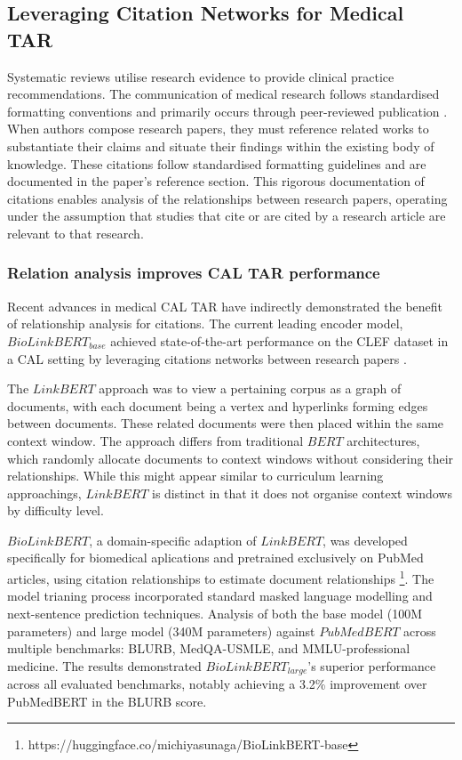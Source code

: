 \documentclass[../main.tex]{subfiles}
\begin{document}
\subsection{Leveraging Citation Networks for Medical TAR}

Systematic reviews utilise research evidence to provide clinical practice recommendations. The communication of medical research follows standardised formatting conventions and primarily occurs through peer-reviewed publication \cite{BMCMedicalResearch}. When authors compose research papers, they must reference related works to substantiate their claims and situate their findings within the existing body of knowledge. These citations follow standardised formatting guidelines and are documented in the paper's reference section. This rigorous documentation of citations enables analysis of the relationships between research papers, operating under the assumption that studies that cite or are cited by a research article are relevant to that research.

\subsubsection{Relation analysis improves CAL TAR performance}

Recent advances in medical CAL TAR have indirectly demonstrated the benefit of relationship analysis for citations. The current leading encoder model, $BioLinkBERT_{base}$ achieved state-of-the-art performance on the CLEF dataset in a CAL setting by leveraging citations networks between research papers \cite{yasunaga2022linkbertpretraininglanguagemodels, goharian_reproducibility_2024}. 


The $LinkBERT$ approach was to view a pertaining corpus as a graph of documents, with each document being a vertex and hyperlinks forming edges between documents. These related documents were then placed within the same context window. The approach differs from traditional $BERT$ architectures, which randomly allocate documents to context windows without considering their relationships. While this might appear similar to curriculum learning approachings, $LinkBERT$ is distinct in that it does not organise context windows by difficulty level. 

$BioLinkBERT$, a domain-specific adaption of $LinkBERT$, was developed specifically for biomedical aplications and pretrained exclusively on PubMed articles, using citation relationships to estimate document relationships \footnote{https://huggingface.co/michiyasunaga/BioLinkBERT-base}. The model trianing process incorporated standard masked language modelling and next-sentence prediction techniques. Analysis of both the base model (100M parameters) and large model (340M parameters) against $PubMedBERT$ across multiple benchmarks:  BLURB\cite{guDomainSpecificLanguageModel2021}, MedQA-USMLE\cite{jinWhatDiseaseDoes2020}, and MMLU-professional medicine\cite{hendrycksMeasuringMassiveMultitask2021}. The results demonstrated $BioLinkBERT_{large}$'s superior performance across all evaluated benchmarks, notably achieving a 3.2\% improvement over PubMedBERT in the BLURB score.
\end{document}
